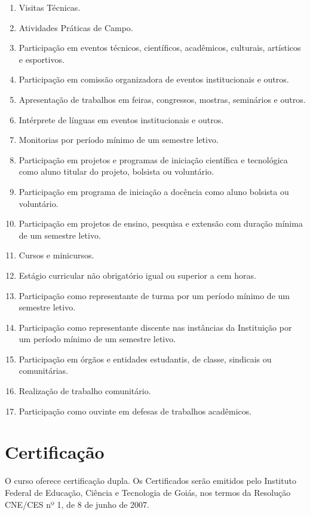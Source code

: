 \documentclass[11pt,fleqn]{book} %
\begin{document}
\begin{enumerate}
	\item Visitas Técnicas.
	\item Atividades Práticas de Campo.
	\item Participação em eventos técnicos, científicos, acadêmicos, culturais, artísticos e esportivos.
	\item Participação em comissão organizadora de eventos institucionais e outros.
	\item Apresentação de trabalhos em feiras, congressos, mostras, seminários e outros.
	\item Intérprete de línguas em eventos institucionais e outros.
	\item Monitorias por período mínimo de um semestre letivo.
	\item Participação em projetos e programas de iniciação científica e tecnológica como aluno titular do projeto, bolsista ou voluntário.
	\item Participação em programa de iniciação a docência como aluno bolsista ou voluntário.
	\item Participação em projetos de ensino, pesquisa e extensão com duração mínima de um semestre letivo.
	\item Cursos e minicursos.
	\item Estágio curricular não obrigatório igual ou superior a cem horas.
	\item Participação como representante de turma por um período mínimo de um semestre letivo.
	\item Participação como representante discente nas instâncias da Instituição por um período mínimo de um semestre letivo.
	\item Participação em órgãos e entidades estudantis, de classe, sindicais ou comunitárias.
	\item Realização de trabalho comunitário.
	\item Participação como ouvinte em defesas de trabalhos acadêmicos.
\end{enumerate}


\section{Certificação}

O curso oferece certificação dupla.
Os Certificados serão emitidos pelo Instituto Federal de Educação, Ciência e Tecnologia de Goiás, nos termos da Resolução CNE/CES nº 1, de 8 de junho de 2007.
\end{document}
